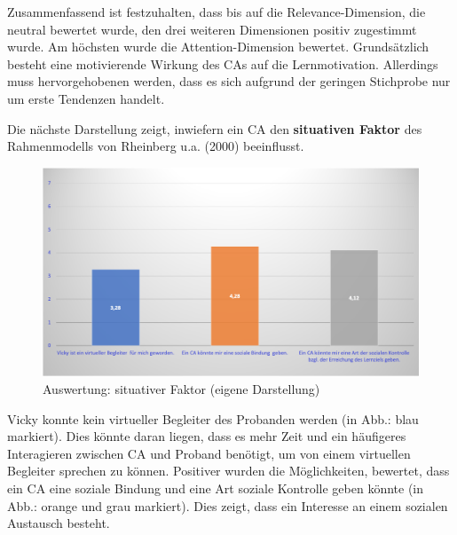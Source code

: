 Zusammenfassend ist festzuhalten, dass bis auf die Relevance-Dimension, die neutral bewertet wurde,
den drei weiteren Dimensionen positiv zugestimmt wurde. Am höchsten wurde die Attention-Dimension bewertet. Grundsätzlich besteht eine
motivierende Wirkung des CAs auf die Lernmotivation. Allerdings muss hervorgehobenen werden, dass es sich aufgrund 
der geringen Stichprobe nur um erste Tendenzen 
handelt.
\pagebreak

Die nächste Darstellung zeigt, inwiefern ein CA den \textbf{situativen Faktor} des Rahmenmodells von Rheinberg u.a. (2000) beeinflusst.
\begin{figure}[H]
    \centering
    \includegraphics[width=0.9\linewidth]{images/Auswertung/RM.png}
   \caption[Auswertung: situativer Faktor ] {Auswertung: situativer Faktor (eigene Darstellung)}
  \label{fig:RM}
\end{figure} 
Vicky konnte kein virtueller Begleiter des Probanden werden (in Abb.: blau markiert). Dies könnte daran liegen, dass es mehr Zeit und ein häufigeres 
Interagieren zwischen CA und Proband benötigt, um von einem virtuellen Begleiter sprechen zu können.
Positiver wurden die Möglichkeiten, bewertet, dass ein CA eine soziale Bindung und eine Art soziale Kontrolle geben könnte (in Abb.: orange und grau markiert).
Dies zeigt, dass ein Interesse an einem sozialen Austausch besteht. 

